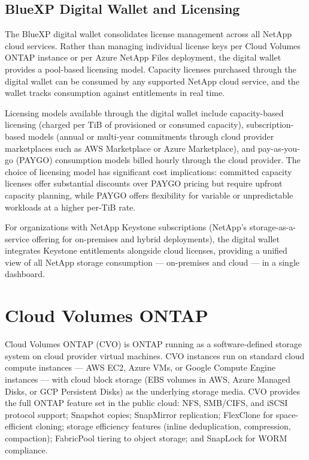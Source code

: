 \subsection{BlueXP Digital Wallet and Licensing}

The BlueXP digital wallet consolidates license management across all NetApp
cloud services. Rather than managing individual license keys per Cloud Volumes
ONTAP instance or per Azure NetApp Files deployment, the digital wallet
provides a pool-based licensing model. Capacity licenses purchased through the
digital wallet can be consumed by any supported NetApp cloud service, and the
wallet tracks consumption against entitlements in real time.

Licensing models available through the digital wallet include capacity-based
licensing (charged per TiB of provisioned or consumed capacity),
subscription-based models (annual or multi-year commitments through cloud
provider marketplaces such as AWS Marketplace or Azure Marketplace), and
pay-as-you-go (PAYGO) consumption models billed hourly through the cloud
provider. The choice of licensing model has significant cost implications:
committed capacity licenses offer substantial discounts over PAYGO pricing but
require upfront capacity planning, while PAYGO offers flexibility for variable
or unpredictable workloads at a higher per-TiB rate.

For organizations with NetApp Keystone subscriptions (NetApp's
storage-as-a-service offering for on-premises and hybrid deployments), the
digital wallet integrates Keystone entitlements alongside cloud licenses,
providing a unified view of all NetApp storage consumption --- on-premises and
cloud --- in a single dashboard.

\section{Cloud Volumes ONTAP}

Cloud Volumes ONTAP (CVO) is ONTAP running as a software-defined storage
system on cloud provider virtual machines. CVO instances run on standard cloud
compute instances --- AWS EC2, Azure VMs, or Google Compute Engine instances
--- with cloud block storage (EBS volumes in AWS, Azure Managed Disks, or GCP
Persistent Disks) as the underlying storage media. CVO provides the full ONTAP
feature set in the public cloud: NFS, SMB/CIFS, and iSCSI protocol support;
Snapshot copies; SnapMirror replication; FlexClone for space-efficient cloning;
storage efficiency features (inline deduplication, compression, compaction);
FabricPool tiering to object storage; and SnapLock for WORM compliance.

